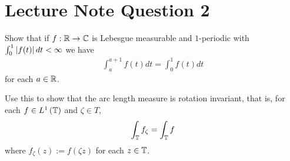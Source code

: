 \section{Lecture Note Question 2}
\horz
Show that if $f: \mathbb R \to \mathbb C$ is Lebesgue measurable and $1$-periodic with $\int_{0}^{1} \left\lvert f(t) \right\rvert dt < \infty$ we have
\begin{align*}
\int_{a}^{a+1} f(t) dt = \int_{0}^{1} f(t) dt
\end{align*}
for each $a\in \mathbb R$.

Use this to show that the arc length measure is rotation invariant, that is, for each $f\in L^{1} \left( \mathbb T \right)$ and $\zeta \in T$,
\begin{align*}
\int_{\mathbb T} f_{\zeta} = \int_{\mathbb T} f 
\end{align*}
where $f_{\zeta} (z) := f(\zeta z)$ for each $z\in \mathbb T$. 
\horz

